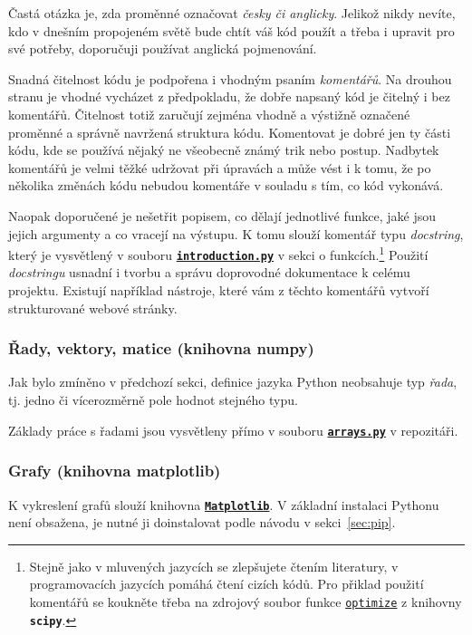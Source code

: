 \documentclass[a4paper,11pt,twoside]{article}
\def\code#1{\textnormal{\texttt{#1}}}
\def\file#1{\textnormal{\textbf{\texttt{#1}}}}
\def\ghfile#1#2{\textnormal{\textbf{\texttt{\href{https://github.com/PavelStransky/PCInPhysics2021/blob/main/#1#2}{#2}}}}}
\theoremstyle{red}
\theoremstyle{green}
\begin{document}
    Častá otázka je, zda proměnné označovat \emph{česky či anglicky}.
    Jelikož nikdy nevíte, kdo v dnešním propojeném světě bude chtít váš kód použít a třeba i upravit pro své potřeby, doporučuji používat anglická pojmenování.
    
    Snadná čitelnost kódu je podpořena i vhodným psaním \emph{komentářů}.
    Na drouhou stranu je vhodné vycházet z předpokladu, že dobře napsaný kód je čitelný i bez komentářů.
    Čitelnost totiž zaručují zejména vhodně a výstižně označené proměnné a správně navržená struktura kódu.
    Komentovat je dobré jen ty části kódu, kde se používá nějaký ne všeobecně známý trik nebo postup.
    Nadbytek komentářů je velmi těžké udržovat při úpravách a může vést i k tomu, že po několika změnách kódu nebudou komentáře v souladu s tím, co kód vykonává.
    
    Naopak doporučené je nešetřit popisem, co dělají jednotlivé funkce, jaké jsou jejich argumenty a co vracejí na výstupu.
    K tomu slouží komentář typu \emph{docstring}, který je vysvětlený v souboru \ghfile{python/basics/}{introduction.py} v sekci o funkcích.\footnote{
        Stejně jako v mluvených jazycích se zlepšujete čtením literatury, v programovacích jazycích pomáhá čtení cizích kódů.
        Pro přiklad použití komentářů se koukněte třeba na zdrojový soubor funkce \code{\href{https://github.com/scipy/scipy/blob/master/scipy/optimize/optimize.py}{optimize}} z knihovny \file{scipy}.
    }
    Použití \emph{docstringu} usnadní i tvorbu a správu doprovodné dokumentace k celému projektu.
    Existují například nástroje, které vám z těchto komentářů vytvoří strukturované webové stránky.

\subsubsection{Řady, vektory, matice (knihovna numpy)}
\label{sec:numpy}
    Jak bylo zmíněno v předchozí sekci, definice jazyka Python neobsahuje typ \emph{řada}, tj. jedno či vícerozměrně pole hodnot stejného typu.

    Základy práce s řadami jsou vysvětleny přímo v souboru \ghfile{python/basics/}{arrays.py} v repozitáři.

\subsubsection{Grafy (knihovna matplotlib)}
    K vykreslení grafů slouží knihovna \file{\href{https://matplotlib.org}{Matplotlib}}.
    V základní instalaci Pythonu není obsažena, je nutné ji doinstalovat podle návodu v sekci~\ref{sec:pip}.
\end{document}
